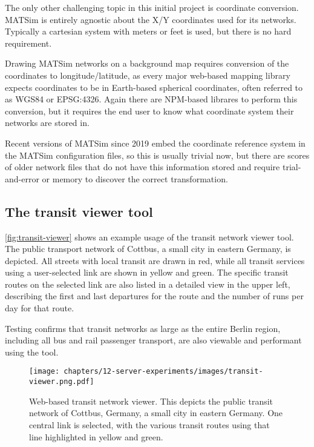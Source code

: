 The only other challenging topic in this initial project is coordinate conversion. MATSim is entirely agnostic about the X/Y coordinates used for its networks. Typically a cartesian system with meters or feet is used, but there is no hard requirement.

Drawing MATSim networks on a background map requires conversion of the coordinates to longitude/latitude, as every major web-based mapping library expects coordinates to be in Earth-based spherical coordinates, often referred to as WGS84 or EPSG:4326. Again there are NPM-based librares to perform this conversion, but it requires the end user to know what coordinate system their networks are stored in.

Recent versions of MATSim since 2019 embed the coordinate reference system in the MATSim configuration files, so this is usually trivial now, but there are scores of older network files that do not have this information stored and require trial-and-error or memory to discover the correct transformation.

\hypertarget{server-experiments-transit-result}{%
\subsection{The transit viewer tool}
\label{server-experiments-tool-transit}}

\autoref{fig:transit-viewer} shows an example usage of the transit network viewer tool. The public transport network of Cottbus, a small city in eastern Germany, is depicted. All streets with local transit are drawn in red, while all transit services using a user-selected link are shown in yellow and green. The specific transit routes on the selected link are also listed in a detailed view in the upper left, describing the first and last departures for the route and the number of runs per day for that route.

Testing confirms that transit networks as large as the entire Berlin region, including all bus and rail passenger transport, are also viewable and performant using the tool.

\begin{figure}[!ht]
  \texttt{[image: chapters/12-server-experiments/images/transit-viewer.png.pdf]}
  \caption[Web-based transit network viewer]{Web-based transit network viewer. This depicts the public transit network of Cottbus, Germany, a small city in eastern Germany. One central link is selected, with the various transit routes using that line highlighted in yellow and green.}
  \label{fig:transit-viewer}
\end{figure}

